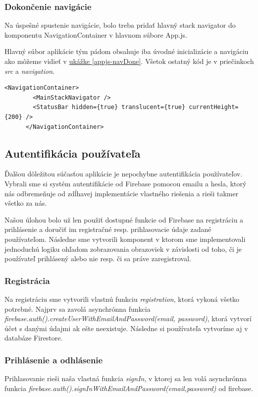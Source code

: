 \subsubsection{Dokončenie navigácie}
Na úspešné spustenie navigácie, bolo treba pridať hlavný stack navigator do komponentu NavigationContainer v hlavnom súbore App.js. 

Hlavný súbor aplikácie tým pádom obsahuje iba úvodné inicializácie a navigáciu ako môžeme vidieť v  \hyperref[appjs-navDone]{ukážke \ref{appjs-navDone}}. Všetok ostatný kód je v priečinkoch \textit{src} a \textit{navigation}.
\begin{lstlisting}[caption={Ukážka z App.js po implementácií navigácie}, label={appjs-navDone}] 
      <NavigationContainer>
        <MainStackNavigator />
        <StatusBar hidden={true} translucent={true} currentHeight={200} />
      </NavigationContainer>
\end{lstlisting}

\subsection{Autentifikácia používateľa}
Ďalšou dôležitou súčasťou aplikácie je nepochybne autentifikácia používateľov. Vybrali sme si systém autentifikácie od Firebase pomocou emailu a hesla, ktorý nás odbremeňuje od zdĺhavej implementácie vlastného riešenia a rieši takmer všetko za nás. 

Našou úlohou bolo už len použiť dostupné funkcie od Firebase na registráciu a prihlásenie a doručiť im registračné resp. prihlasovacie údaje zadané používateľom. Následne sme vytvorili komponent v ktorom sme implementovali jednoduchú logiku ohľadom zobrazovania obrazoviek v závislosti od toho, či je používateľ prihlásený alebo nie resp. či sa práve zaregistroval.
\subsubsection{Registrácia}
Na registráciu sme vytvorili vlastnú funkciu \textit{registration}, ktorá vykoná všetko potrebné. Najprv sa zavolá asynchrónna funkcia \textit{firebase.auth().createUserWithEmailAndPassword(email, password)}, ktorá vytvorí účet s danými údajmi ak ešte neexistuje. Následne si používateľa vytvoríme aj v databáze Firestore. 
\subsubsection{Prihlásenie a odhlásenie}
Prihlasovanie rieši naša vlastná funkcia \textit{signIn}, v ktorej sa len volá asynchrónna funkcia \textit{firebase.auth().signInWithEmailAndPassword(email,password)} od firebase. 

